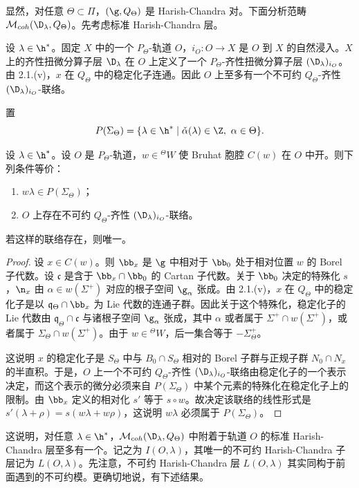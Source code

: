 显然，对任意 $\Theta\subset\Pi$，$(\g,Q_\Theta)$ 是 Harish-Chandra 对。下面分析范畴 $\mathcal{M}_{coh}(\D_\lambda,Q_\Theta)$。先考虑标准 Harish-Chandra 层。

设 $\lambda\in\h^*$。固定 $X$ 中的一个 $P_\Theta$-轨道 $O$，$i_O:O\to X$ 是 $O$ 到 $X$ 的自然浸入。$X$ 上的齐性扭微分算子层 $\D_\lambda$ 在 $O$ 上定义了一个 $P_\Theta$-齐性扭微分算子层 $(\D_\lambda)_{i_O}$。由 2.1.(v)，$x$ 在 $Q_\Theta$ 中的稳定化子连通。因此 $O$ 上至多有一个不可约 $Q_\Theta$-齐性 $(\D_\lambda)_{i_O}$-联络。

置
$$P(\Sigma_\Theta)=\{\lambda\in\h^*\mid \check\alpha(\lambda)\in\Z,\ \alpha\in\Theta\}.$$

\begin{lemma}\label{lem:06.2.2}
设 $\lambda\in\h^*$。设 $O$ 是 $P_\Theta$-轨道，$w\in{}^{\Theta}W$ 使 Bruhat 胞腔 $C(w)$ 在 $O$ 中开。则下列条件等价：
\begin{enumerate}[label=(\roman*)]
\item $w\lambda\in P(\Sigma_\Theta)$；
\item $O$ 上存在不可约 $Q_\Theta$-齐性 $(\D_\lambda)_{i_O}$-联络。
\end{enumerate}
若这样的联络存在，则唯一。
\end{lemma}

\begin{proof}
设 $x\in C(w)$。则 $\bb_x$ 是 $\g$ 中相对于 $\bb_0$ 处于相对位置 $w$ 的 Borel 子代数。设 $\mathfrak{c}$ 是含于 $\bb_x\cap\bb_0$ 的 Cartan 子代数。关于 $\bb_0$ 决定的特殊化 $s$，$\n_x$ 由 $\alpha\in w(\Sigma^+)$ 对应的根子空间 $\g_\alpha$ 张成。由 2.1.(v)，$x$ 在 $Q_\Theta$ 中的稳定化子是以 $\mathfrak{q}_\Theta\cap\bb_x$ 为 Lie 代数的连通子群。因此关于这个特殊化，稳定化子的 Lie 代数由 $\mathfrak{q}_\Theta\cap\mathfrak{c}$ 与诸根子空间 $\g_\alpha$ 张成，其中 $\alpha$ 或者属于 $\Sigma^+\cap w(\Sigma^+)$，或者属于 $\Sigma_\Theta\cap w(\Sigma^+)$。由于 $w\in{}^{\Theta}W$，后一集合等于 $-\Sigma^+_\Theta$。

这说明 $x$ 的稳定化子是 $S_\Theta$ 中与 $B_0\cap S_\Theta$ 相对的 Borel 子群与正规子群 $N_0\cap N_x$ 的半直积。于是，$O$ 上一个不可约 $Q_\Theta$-齐性 $(\D_\lambda)_{i_O}$-联络由稳定化子的一个表示决定，而这个表示的微分必须来自 $P(\Sigma_\Theta)$ 中某个元素的特殊化在稳定化子上的限制。由 $\bb_x$ 定义的相对化 $s'$ 等于 $s\circ w$。故决定该联络的线性形式是 $s'(\lambda+\rho)=s(w\lambda+w\rho)$，这说明 $w\lambda$ 必须属于 $P(\Sigma_\Theta)$。
\end{proof}

这说明，对任意 $\lambda\in\h^*$，$\mathcal{M}_{coh}(\D_\lambda,Q_\Theta)$ 中附着于轨道 $O$ 的标准 Harish-Chandra 层至多有一个。记之为 $I(O,\lambda)$，其唯一的不可约 Harish-Chandra 子层记为 $L(O,\lambda)$。先注意，不可约 Harish-Chandra 层 $L(O,\lambda)$ 其实同构于前面遇到的不可约模。更确切地说，有下述结果。

